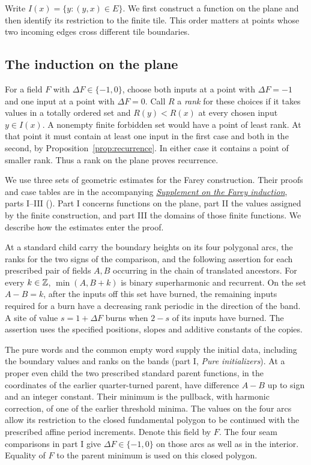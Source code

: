 Write $I(x)=\{y:(y,x)\in E\}$. We first construct a function on the plane and then identify its restriction to the finite tile. This order matters at points whose two incoming edges cross different tile boundaries.

\subsection*{The induction on the plane}
For a field $F$ with $\Delta F\in\{-1,0\}$, choose both inputs at a point with $\Delta F=-1$ and one input at a point with $\Delta F=0$. Call $R$ a \emph{rank} for these choices if it takes values in a totally ordered set and $R(y)<R(x)$ at every chosen input $y\in I(x)$. A nonempty finite forbidden set would have a point of least rank. At that point it must contain at least one input in the first case and both in the second, by Proposition~\ref{prop:recurrence}. In either case it contains a point of smaller rank. Thus a rank on the plane proves recurrence.

We use three sets of geometric estimates for the Farey construction. Their proofs and case tables are in the accompanying \href{./Supplement/farey_induction.pdf}{\emph{Supplement on the Farey induction}}, parts I--III (). Part I concerns functions on the plane, part II the values assigned by the finite construction, and part III the domains of those finite functions. We describe how the estimates enter the proof.

At a standard child carry the boundary heights on its four polygonal arcs, the ranks for the two signs of the comparison, and the following assertion for each prescribed pair of fields $A,B$ occurring in the chain of translated ancestors. For every $k\in\mathbb{Z}$, $\min(A,B+k)$ is binary superharmonic and recurrent. On the set $A-B=k$, after the inputs off this set have burned, the remaining inputs required for a burn have a decreasing rank periodic in the direction of the band. A site of value $s=1+\Delta F$ burns when $2-s$ of its inputs have burned. The assertion uses the specified positions, slopes and additive constants of the copies.

The pure words and the common empty word supply the initial data, including the boundary values and ranks on the bands (part I, \emph{Pure initializers}). At a proper even child the two prescribed standard parent functions, in the coordinates of the earlier quarter-turned parent, have difference $A-B$ up to sign and an integer constant. Their minimum is the pullback, with harmonic correction, of one of the earlier threshold minima. The values on the four arcs allow its restriction to the closed fundamental polygon to be continued with the prescribed affine period increments. Denote this field by $F$. The four seam comparisons in part I give $\Delta F\in\{-1,0\}$ on those arcs as well as in the interior. Equality of $F$ to the parent minimum is used on this closed polygon.

